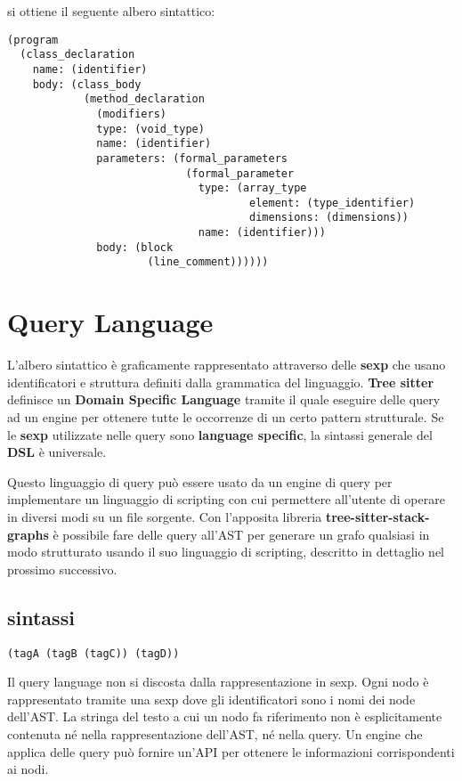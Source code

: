 si ottiene il seguente albero sintattico:

\begin{lstlisting}
(program
  (class_declaration
    name: (identifier)
    body: (class_body
            (method_declaration
              (modifiers)
              type: (void_type)
              name: (identifier)
              parameters: (formal_parameters
                            (formal_parameter
                              type: (array_type
                                      element: (type_identifier)
                                      dimensions: (dimensions))
                              name: (identifier)))
              body: (block
                      (line_comment))))))
\end{lstlisting}

\section{Query Language}

L'albero sintattico \`e graficamente rappresentato attraverso delle \textbf{sexp} che usano identificatori e struttura definiti dalla grammatica del linguaggio.
\textbf{Tree sitter} definisce un \textbf{Domain Specific Language} \cite{TreeSitterQuerySyntax} tramite il quale eseguire delle query ad un engine per ottenere tutte le occorrenze di un certo pattern strutturale.
Se le \textbf{sexp} utilizzate nelle query sono \textbf{language specific}, la sintassi generale del \textbf{DSL} \`e universale.

Questo linguaggio di query pu\`o essere usato da un engine di query per implementare un linguaggio di scripting con cui permettere all'utente di operare in diversi modi su un file sorgente.
Con l'apposita libreria \textbf{tree-sitter-stack-graphs} \`e possibile fare delle query all'AST per generare un grafo qualsiasi in modo strutturato usando il suo linguaggio di scripting, descritto in dettaglio nel prossimo successivo.

\subsection{sintassi}

\begin{lstlisting}
(tagA (tagB (tagC)) (tagD))
\end{lstlisting}

Il query language non si discosta dalla rappresentazione in sexp.
Ogni nodo \`e rappresentato tramite una sexp dove gli identificatori sono i nomi dei node dell'AST.
La stringa del testo a cui un nodo fa riferimento non \`e esplicitamente contenuta n\'e nella rappresentazione dell'AST, n\'e nella query.
Un engine che applica delle query pu\`o fornire un'API per ottenere le informazioni corrispondenti ai nodi.

